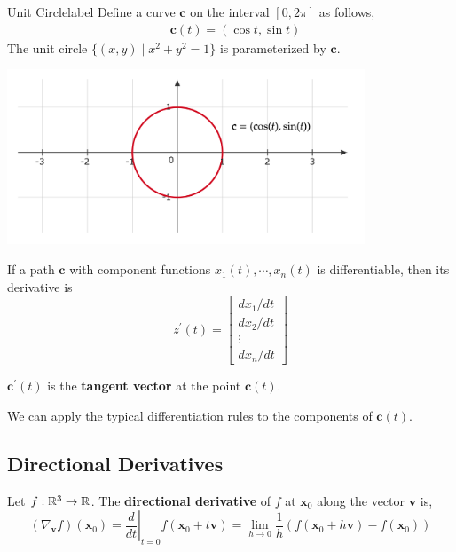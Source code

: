 \begin{ex}{Unit Circle}{label}
    Define a curve $\mathbf{c}$ on the interval $[0, 2\pi]$ as follows,
    \begin{align*}
        &\mathbf{c}(t)=(\cos t, \sin t)
    \end{align*}
    The unit circle $\{(x, y) \mid x^2+y^2=1\}$ is parameterized by $\mathbf{c}$.
    \begin{center}
    \includegraphics[width=0.8\textwidth]{figures/wk-2/fig-29.png}
    \end{center}
\end{ex}

\begin{thm}
    If a path $\mathbf{c}$ with component functions $x_1(t), \cdots, x_n(t)$ is differentiable, then its derivative is
    \[z^{\prime}(t)=\left[\begin{array}{c}
    d x_1 / d t \\
    d x_2 / d t \\
    \vdots \\
    d x_n / d t
    \end{array}\right]\]
\end{thm}

\begin{prop}
    $\mathbf{c}^{\prime}(t)$ is the \textbf{tangent vector} at the point $\mathbf{c}(t)$.
\end{prop}

\begin{marginfigure}
    We can apply the typical differentiation rules to the components of $\mathbf{c}(t)$.
\end{marginfigure}

\subsection{Directional Derivatives}
\begin{defn}
    Let $f: \mathbb{R}^3 \rightarrow \mathbb{R}$. The \textbf{directional derivative} of $f$ at $\mathbf{x}_0$ along the vector $\mathbf{v}$ is,
    \[\left(\nabla_{\mathbf{v}} f\right)\left(\mathbf{x}_0\right)=\left.\frac{d}{d t}\right|_{t=0} f\left(\mathbf{x}_0+t \mathbf{v}\right) = \lim _{h \rightarrow 0} \frac{1}{h}\left(f\left(\mathbf{x}_0+h \mathbf{v}\right)-f\left(\mathbf{x}_0\right)\right)\]
\end{defn}

